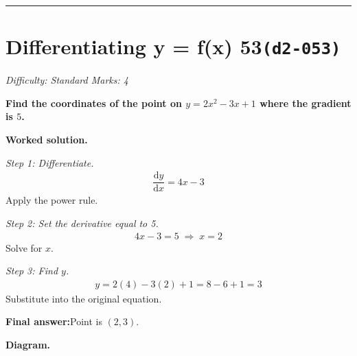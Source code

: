 \documentclass[11pt]{article}
\newcommand{\question}[1]{\par\medskip\noindent\textbf{#1}\par}
\begin{document}
\medskip\hrule

\section*{Differentiating y = f(x) 53\quad\small\texttt{(d2-053)}}
\textit{Difficulty: Standard \quad\textbar\quad Marks: 4}

\question{Find the coordinates of the point on \( y = 2x^2 - 3x + 1 \) where the gradient is \( 5 \).}

\textbf{Worked solution.}

\textit{Step 1: Differentiate.}
\[\begin{gathered}
\dfrac{\mathrm{d}y}{\mathrm{d}x} = 4x - 3
\end{gathered}\]
Apply the power rule.

\textit{Step 2: Set the derivative equal to 5.}
\[\begin{gathered}
4x - 3 = 5 \;\Rightarrow\; x = 2
\end{gathered}\]
Solve for \( x \).

\textit{Step 3: Find \( y \).}
\[\begin{gathered}
y = 2(4) - 3(2) + 1 = 8 - 6 + 1 = 3
\end{gathered}\]
Substitute into the original equation.

\begin{answerbox}
\textbf{Final answer:}\quad Point is \(\displaystyle  (2, 3) \).
\end{answerbox}
\textbf{Diagram.}
\end{document}
